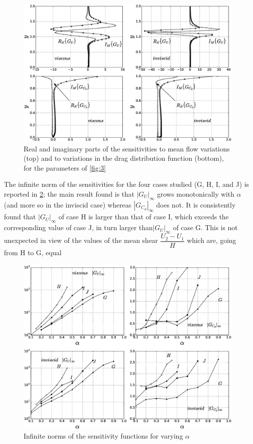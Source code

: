 \begin{figure}[H]
	\centering
	\includegraphics[width=1\linewidth]{chapter_3/figure/4}
	\caption{Real and imaginary parts of the sensitivities to mean flow variations (top) and to variations in the drag distribution
		function (bottom), for the parameters of \ref{fig:3}}
	\label{fig:4}
\end{figure}

The infinite norm of the sensitivities for the four cases studied (G, H, I, and J) is reported in
\ref{fig:5}; the main result found is that ${|G_U|}_{\infty}$ grows monotonically with $\alpha$ (and more so in the inviscid
case) whereas ${|G_{C_d}|}_{\infty}$ does not. It is consistently found that ${|G_U|}_{\infty}$ of case H is larger than that of
case I, which exceeds the corresponding value of case J, in turn larger than${|G_U|}_{\infty}$ of case G. This is
not unexpected in view of the values of the mean shear $\dfrac{U_2 - U_1}{H}$  which are, going from H to G, equal

\begin{figure}[H]
	\centering
	\includegraphics[width=1\linewidth]{chapter_3/figure/5}
	\caption{Infinite norms of the sensitivity functions for varying $\alpha$}
	\label{fig:5}
\end{figure}

